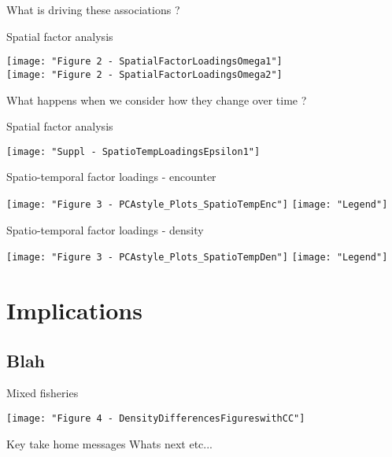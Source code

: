 \documentclass[xcolor=x11names,compress]{beamer}
\renewcommand{\(}{\begin{columns}}
\renewcommand{\)}{\end{columns}}
\newcommand{\<}[1]{\begin{column}{#1}}
\renewcommand{\>}{\end{column}}
\begin{document}
\begin{frame}
	What is driving these associations ?
\end{frame}

\begin{frame}{Spatial factor analysis}

\centering
\texttt{[image: "Figure 2 - SpatialFactorLoadingsOmega1"]}
\\
\texttt{[image: "Figure 2 - SpatialFactorLoadingsOmega2"]}
	
\end{frame}

\begin{frame}
        What happens when we consider how they change over time ?	
\end{frame}

\begin{frame}{Spatial factor analysis}

\centering
\texttt{[image: "Suppl - SpatioTempLoadingsEpsilon1"]}
	
\end{frame}


\begin{frame}{Spatio-temporal factor loadings - encounter}

\centering
\texttt{[image: "Figure 3 - PCAstyle\_Plots\_SpatioTempEnc"]}
\texttt{[image: "Legend"]}

\end{frame}

\begin{frame}{Spatio-temporal factor loadings - density}

\centering
\texttt{[image: "Figure 3 - PCAstyle\_Plots\_SpatioTempDen"]}
\texttt{[image: "Legend"]}


\end{frame}

\section{Implications}
\subsection{Blah}

\begin{frame}{Mixed fisheries}
	
\centering
\texttt{[image: "Figure 4 - DensityDifferencesFigureswithCC"]}

\end{frame}


\begin{frame}
	Key take home messages
	Whats next etc...
\end{frame}

\end{document}
